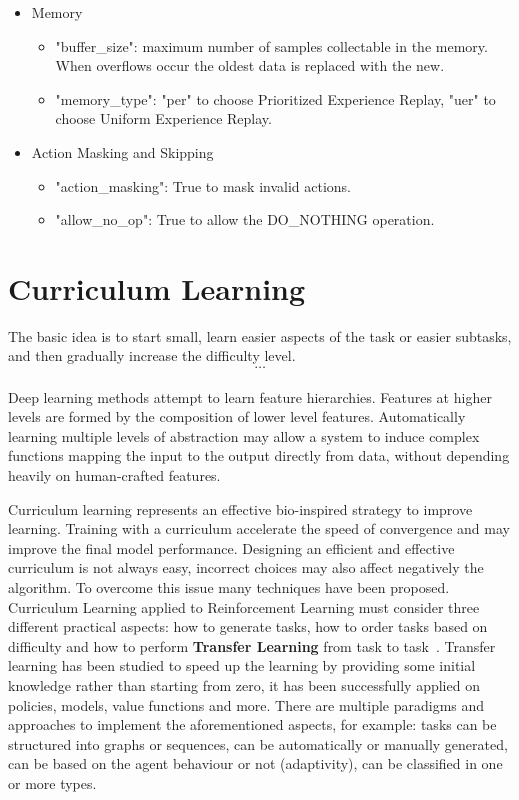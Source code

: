 \documentclass[11pt, a4paper, hidelinks]{report}
\begin{document}
\begin{itemize}
\begin{itemize}
	\end{itemize}
	\item Memory
	\begin{itemize}
		\item "buffer\_size": maximum number of samples collectable in the memory.
When overflows occur the oldest data is replaced with the new.
		\item "memory\_type": "per" to choose Prioritized Experience Replay, "uer" to choose Uniform Experience Replay.
	\end{itemize}
	\item Action Masking and Skipping
	\begin{itemize}
		\item "action\_masking": True to mask invalid actions.
		\item "allow\_no\_op": True to allow the DO\_NOTHING operation.
	\end{itemize}
\end{itemize}

\section{Curriculum Learning}\label{sec:curriculum-learning}

\begin{quoting}[font=itshape, begintext={"}, endtext={"\citep{bengio-curiculum}}]
The basic idea is to start small, learn easier aspects of the task or easier subtasks, and then gradually increase the difficulty level.\\
\[\dots\]\\
Deep learning methods attempt to learn feature hierarchies.
Features at higher levels are formed by the composition of lower level features.
Automatically learning multiple levels of abstraction may allow a system to induce complex functions mapping the input to the output directly from data, without depending heavily on human-crafted features.
\end{quoting}

Curriculum learning represents an effective bio-inspired strategy to improve learning.
Training with a curriculum accelerate the speed of convergence and may improve the final model performance.
Designing an efficient and effective curriculum is not always easy, incorrect choices may also affect negatively the algorithm.
To overcome this issue many techniques have been proposed.
Curriculum Learning applied to Reinforcement Learning must consider three different practical aspects: how to generate tasks, how to order tasks based on difficulty and how to perform \textbf{Transfer Learning} from task to task~\citep{narvekar2020curriculum}.
Transfer learning has been studied to speed up the learning by providing some initial knowledge rather than starting from zero, it has been successfully applied on policies, models, value functions and more.
There are multiple paradigms and approaches to implement the aforementioned aspects, for example: tasks can be structured into graphs or sequences, can be automatically or manually generated, can be based on the agent behaviour or not (adaptivity), can be classified in one or more types.
\end{document}
